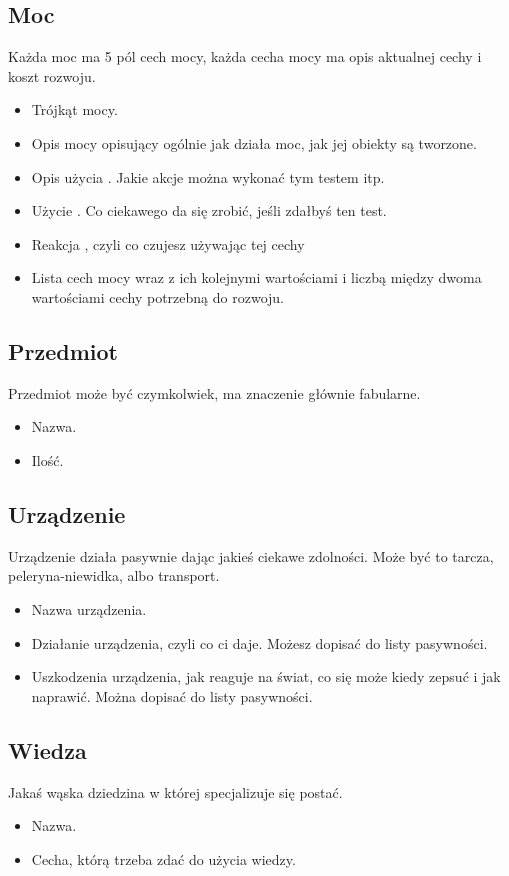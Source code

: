 \subsection{Moc}
Każda moc ma 5 pól cech mocy, każda cecha mocy ma opis aktualnej cechy i koszt rozwoju.
\begin{itemize} 
\item Trójkąt mocy.
\item Opis mocy opisujący ogólnie jak działa moc, jak jej obiekty są tworzone.
\item Opis użycia \absm{}. Jakie akcje można wykonać tym testem itp.
\item Użycie \abdm{}. Co ciekawego da się zrobić, jeśli zdałbyś ten test.
\item Reakcja \abrm{}, czyli co czujesz używając tej cechy
\item Lista cech mocy wraz z ich kolejnymi wartościami i liczbą \xpmcn{} między dwoma wartościami cechy potrzebną do rozwoju.
\end{itemize}

\subsection{Przedmiot}
Przedmiot może być czymkolwiek, ma znaczenie głównie fabularne.
\begin{itemize}
 \item Nazwa.
 \item Ilość.
\end{itemize}

\subsection{Urządzenie}
Urządzenie działa pasywnie dając jakieś ciekawe zdolności.
Może być to tarcza, peleryna-niewidka, albo transport.
\begin{itemize}
\item Nazwa urządzenia.
\item Działanie urządzenia, czyli co ci daje. Możesz dopisać do listy pasywności.
\item Uszkodzenia urządzenia, jak reaguje na świat, co się może kiedy zepsuć i jak naprawić. Można dopisać do listy pasywności.
\end{itemize}

\subsection{Wiedza}
Jakaś wąska dziedzina w której specjalizuje się postać.
\begin{itemize}
 \item Nazwa.
 \item Cecha, którą trzeba zdać do użycia wiedzy.
\end{itemize}

